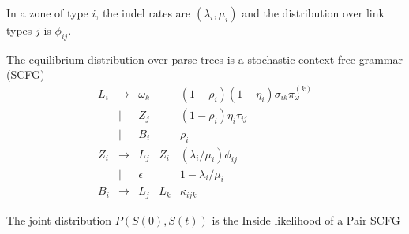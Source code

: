 \documentclass{article}
\begin{document}
In a zone of type $i$, the indel rates are $(\lambda_i,\mu_i)$
and the distribution over link types $j$ is $\phi_{ij}$.

The equilibrium distribution over parse trees is a stochastic context-free grammar (SCFG)
\[
\begin{array}{rclll}
  L_i & \to & \omega_k & & (1-\rho_i) (1-\eta_i) \sigma_{ik} \pi^{(k)}_{\omega} \\
      & | & Z_j & & (1-\rho_i) \eta_i \tau_{ij} \\
      & | & B_i & & \rho_i \\
  Z_i & \to & L_j & Z_i & (\lambda_i/\mu_i) \phi_{ij} \\
        & | & \epsilon & & 1 - \lambda_i/\mu_i \\
  B_i & \to & L_j & L_k & \kappa_{ijk}
\end{array}
\]

The joint distribution $P(S(0),S(t))$ is the Inside likelihood of a Pair SCFG
\end{document}
